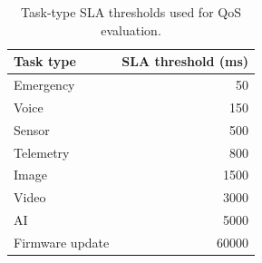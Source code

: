 \begin{table}[H]
\centering
\caption{Task-type SLA thresholds used for QoS evaluation.}
\label{tab:sla_thresholds}
\footnotesize
\begin{tabular}{@{}lr@{}}
\toprule
Task type & SLA threshold (ms) \\
\midrule
Emergency & 50 \\
Voice & 150 \\
Sensor & 500 \\
Telemetry & 800 \\
Image & 1500 \\
Video & 3000 \\
AI & 5000 \\
Firmware update & 60000 \\
\bottomrule
\end{tabular}
\end{table}
